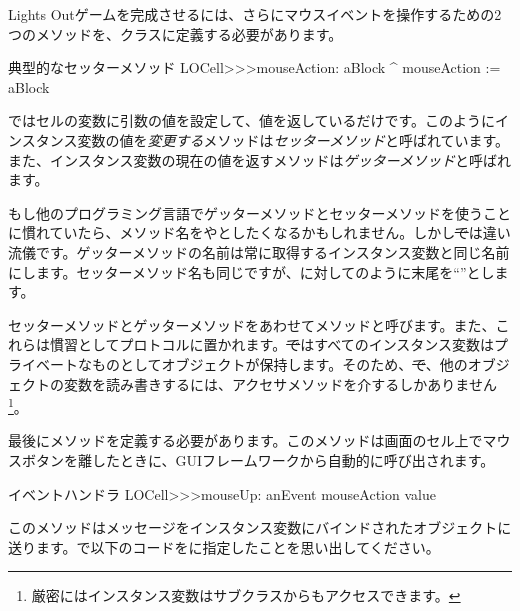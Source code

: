 \documentclass[a4paper,10pt,twoside]{book}
\begin{document}
Lights Outゲームを完成させるには、さらにマウスイベントを操作するための2つのメソッドを、クラスに定義する必要があります。

\begin{method}[mouseAction:]{典型的なセッターメソッド}
LOCell>>>mouseAction: aBlock
   ^ mouseAction := aBlock
\end{method}

 ではセルの変数に引数の値を設定して、値を返しているだけです。このようにインスタンス変数の値を\emph{変更する}メソッドは\emph{セッターメソッド}と呼ばれています。また、インスタンス変数の現在の値を返すメソッドは\emph{ゲッターメソッド}と呼ばれます。

もし他のプログラミング言語でゲッターメソッドとセッターメソッドを使うことに慣れていたら、メソッド名をやとしたくなるかもしれません。しかし\st では違い流儀です。ゲッターメソッドの名前は常に取得するインスタンス変数と同じ名前にします。セッターメソッド名も同じですが、に対してのように末尾を``\ct{:}''とします。

セッターメソッドとゲッターメソッドをあわせてメソッドと呼びます。また、これらは慣習としてプロトコルに置かれます。\st ではすべてのインスタンス変数はプライベートなものとしてオブジェクトが保持します。そのため、\st で、他のオブジェクトの変数を読み書きするには、アクセサメソッドを介するしかありません\footnote{厳密にはインスタンス変数はサブクラスからもアクセスできます。}。


最後にメソッドを定義する必要があります。このメソッドは画面のセル上でマウスボタンを離したときに、GUIフレームワークから自動的に呼び出されます。

\begin{method}[sbecellmouseup]{イベントハンドラ}
LOCell>>>mouseUp: anEvent
   mouseAction value
\end{method}



このメソッドはメッセージをインスタンス変数にバインドされたオブジェクトに送ります。で以下のコードをに指定したことを思い出してください。
\end{document}
